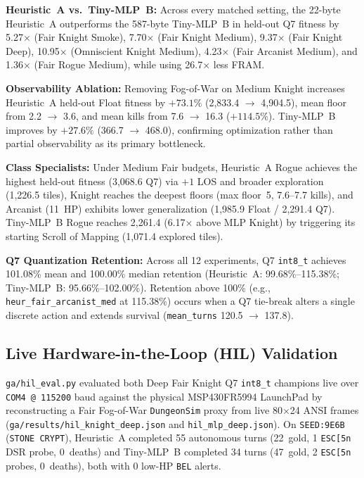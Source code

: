\documentclass[conference]{IEEEtran}
\begin{document}
\textbf{Heuristic~A vs.\ Tiny-MLP~B:} Across every matched setting, the 22-byte Heuristic~A outperforms the 587-byte Tiny-MLP~B in held-out Q7 fitness by 5.27$\times$ (Fair Knight Smoke), 7.70$\times$ (Fair Knight Medium), 9.37$\times$ (Fair Knight Deep), 10.95$\times$ (Omniscient Knight Medium), 4.23$\times$ (Fair Arcanist Medium), and 1.36$\times$ (Fair Rogue Medium), while using 26.7$\times$ less FRAM.

\textbf{Observability Ablation:} Removing Fog-of-War on Medium Knight increases Heuristic~A held-out Float fitness by $+73.1\%$ (2,833.4 $\to$ 4,904.5), mean floor from 2.2 $\to$ 3.6, and mean kills from 7.6 $\to$ 16.3 ($+114.5\%$). Tiny-MLP~B improves by $+27.6\%$ (366.7 $\to$ 468.0), confirming optimization rather than partial observability as its primary bottleneck.

\textbf{Class Specialists:} Under Medium Fair budgets, Heuristic~A Rogue achieves the highest held-out fitness (3,068.6 Q7) via $+1$ LOS and broader exploration (1,226.5 tiles), Knight reaches the deepest floors (max floor~5, 7.6--7.7 kills), and Arcanist (11~HP) exhibits lower generalization (1,985.9 Float / 2,291.4 Q7). Tiny-MLP~B Rogue reaches 2,261.4 (6.17$\times$ above MLP Knight) by triggering its starting Scroll of Mapping (1,071.4 explored tiles).

\textbf{Q7 Quantization Retention:} Across all 12 experiments, Q7 \texttt{int8\_t} achieves 101.08\% mean and 100.00\% median retention (Heuristic~A: 99.68\%--115.38\%; Tiny-MLP~B: 95.66\%--102.00\%). Retention above 100\% (e.g., \texttt{heur\_fair\_arcanist\_med} at 115.38\%) occurs when a Q7 tie-break alters a single discrete action and extends survival (\texttt{mean\_turns} 120.5 $\to$ 137.8).

\subsection{Live Hardware-in-the-Loop (HIL) Validation}
\texttt{ga/hil\_eval.py} evaluated both Deep Fair Knight Q7 \texttt{int8\_t} champions live over \texttt{COM4 @ 115200} baud against the physical MSP430FR5994 LaunchPad by reconstructing a Fair Fog-of-War \texttt{DungeonSim} proxy from live 80$\times$24 ANSI frames (\texttt{ga/results/hil\_knight\_deep.json} and \texttt{hil\_mlp\_deep.json}). On \texttt{SEED:9E6B} (\texttt{STONE CRYPT}), Heuristic~A completed 55 autonomous turns (22~gold, 1 \texttt{ESC[5n} DSR probe, 0~deaths) and Tiny-MLP~B completed 34 turns (47~gold, 2 \texttt{ESC[5n} probes, 0~deaths), both with 0 low-HP \texttt{BEL} alerts.
\end{document}

